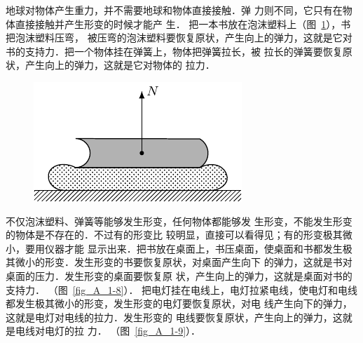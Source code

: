    地球对物体产生重力，并不需要地球和物体直接接触．弹
力则不同，它只有在物体直接接触并产生形变的时候才能产
生．
把一本书放在泡沫塑料上（图~\ref{fig_A_1-7}），书把泡沫塑料压弯，
被压弯的泡沫塑料要恢复原状，产生向上的弹力，这就是它对
书的支持力．把一个物体挂在弹簧上，物体把弹簧拉长，被
拉长的弹簧要恢复原状，产生向上的弹力，这就是它对物体的
拉力．
\begin{figure}[htbp]
    \centering
    \includegraphics{fig/A/1-7.pdf} 
    \caption{} \label{fig_A_1-7} 
\end{figure} 

    不仅泡沫塑料、弹簧等能够发生形变，任何物体都能够发
生形变，不能发生形变的物体是不存在的．不过有的形变比
较明显，直接可以看得见；有的形变极其微小，要用仪器才能
显示出来．把书放在桌面上，书压桌面，使桌面和书都发生极
其微小的形变．发生形变的书要恢复原状，对桌面产生向下
的弹力，这就是书对桌面的压力．发生形变的桌面要恢复原
状，产生向上的弹力，这就是桌面对书的支持力． （图~\ref{fig_A_1-8}）．
把电灯挂在电线上，电灯拉紧电线，使电灯和电线
都发生极其微小的形变，发生形变的电灯要恢复原状，对电
线产生向下的弹力，这就是电灯对电线的拉力．发生形变的
电线要恢复原状，产生向上的弹力，这就是电线对电灯的拉
力． （图~\ref{fig_A_1-9}）．

